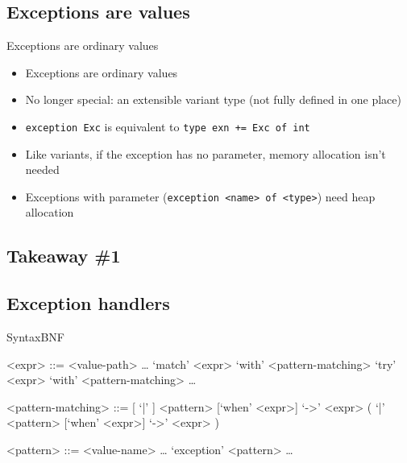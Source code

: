 %
%
\subsection{Exceptions are values}

\begin{frame}{Exceptions are ordinary values}
\begin{itemize}
\item Exceptions are ordinary values\footnotemark
\item No longer special: an extensible variant type (not fully defined in one place)
\item \texttt{exception Exc} is equivalent to \texttt{type exn += Exc of int}
\item Like variants, if the exception has no parameter, memory allocation isn't needed
\item Exceptions with parameter (\texttt{exception <name> of <type>}) need heap allocation
\end{itemize}
\end{frame}


%
%
\subsection*{Takeaway \#1}
\frameSubsectionTakeaway{}



%
%
\subsection{Exception handlers}

\begin{frame}[fragile]{Syntax}{BNF\footnotemark}
\begin{grammar}
<expr> ::= <value-path>
  \alt \dots
	\alt `match' <expr> `with' <pattern-matching>
	\alt `try' <expr> `with' <pattern-matching>
  \alt \dots

<pattern-matching> ::= [ `|' ] <pattern> [`when' <expr>] `->' <expr> ( `|' <pattern> [`when' <expr>] `->' <expr> )

<pattern> ::= <value-name>
	\alt \dots
	\alt `exception' <pattern>
	\alt \dots
\end{grammar}
\end{frame}


